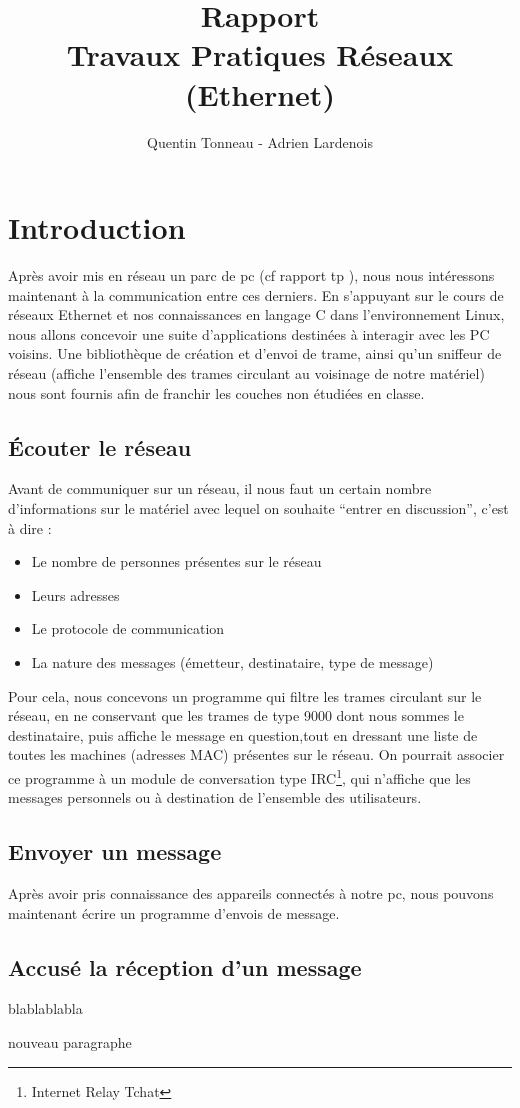 \documentclass[a4paper,11pt]{article}
\title {Rapport \\ Travaux Pratiques Réseaux (Ethernet)}
\author {Quentin Tonneau - Adrien Lardenois}
\date{}
\begin{document}
	\maketitle %
	\tableofcontents %
	\newpage %
	
	
	
	
	
	
	\section{Introduction}
	Après avoir mis en réseau un parc de pc (cf rapport tp ), nous nous intéressons maintenant à la communication entre ces derniers. En s'appuyant sur le cours de réseaux Ethernet et nos connaissances en langage C dans l'environnement Linux, nous allons concevoir une suite d'applications destinées à interagir avec les PC voisins. Une bibliothèque de création et d'envoi de trame, ainsi qu'un sniffeur de réseau (affiche l'ensemble des trames circulant au voisinage de notre matériel) nous sont fournis afin de franchir les couches non étudiées en classe. %
	\subsection{Écouter le réseau}
	Avant de communiquer sur un réseau, il nous faut un certain nombre d'informations sur le matériel avec lequel on souhaite ``entrer en discussion'', c'est à dire :
	\begin{itemize}
		\item Le nombre de personnes présentes sur le réseau
		\item Leurs adresses
		\item Le protocole de communication
		\item La nature des messages (émetteur, destinataire, type de message)
	\end{itemize}
	Pour cela, nous concevons un programme qui filtre les trames circulant sur le réseau, en ne conservant que les trames de type 9000 dont nous sommes le destinataire, puis affiche le message en question,tout en dressant une liste de toutes les machines (adresses MAC) présentes sur le réseau. On pourrait associer ce programme à un module de conversation type IRC\footnote{Internet Relay Tchat}, qui n'affiche que les messages personnels ou à destination de l'ensemble des utilisateurs.
	\subsection{Envoyer un message}
	Après avoir pris connaissance des appareils connectés à notre pc, nous pouvons maintenant écrire un programme d'envois de message.
	\subsection{Accusé la réception d'un message}
	blablablabla
	
	nouveau paragraphe
\end{document}
